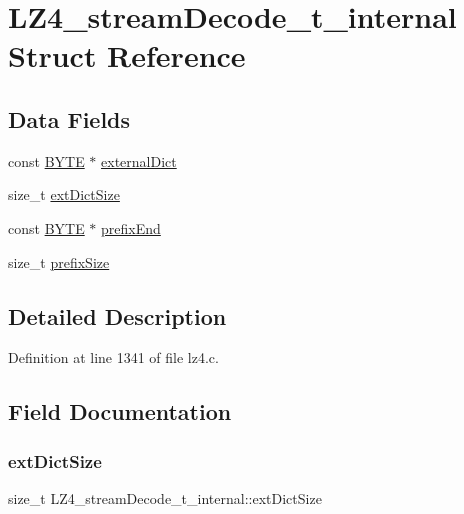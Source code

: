 \hypertarget{structLZ4__streamDecode__t__internal}{}\section{L\+Z4\+\_\+stream\+Decode\+\_\+t\+\_\+internal Struct Reference}
\label{structLZ4__streamDecode__t__internal}
\subsection*{Data Fields}
\begin{DoxyCompactItemize}
\item 
const \mbox{\hyperlink{lz4_8c_a4ae1dab0fb4b072a66584546209e7d58}{B\+Y\+TE}} $\ast$ \mbox{\hyperlink{structLZ4__streamDecode__t__internal_a0edc5a25f4e1e84e48c1a60900dabd4f}{external\+Dict}}
\item 
size\+\_\+t \mbox{\hyperlink{structLZ4__streamDecode__t__internal_a6c8e2dcc2579727808da0bfe7a44eaa0}{ext\+Dict\+Size}}
\item 
const \mbox{\hyperlink{lz4_8c_a4ae1dab0fb4b072a66584546209e7d58}{B\+Y\+TE}} $\ast$ \mbox{\hyperlink{structLZ4__streamDecode__t__internal_ae54ddf8eaf34cbc8919fb0dea3a5cb60}{prefix\+End}}
\item 
size\+\_\+t \mbox{\hyperlink{structLZ4__streamDecode__t__internal_a44f5f7acc14c2bb3865eccd5372107c4}{prefix\+Size}}
\end{DoxyCompactItemize}


\subsection{Detailed Description}


Definition at line 1341 of file lz4.\+c.



\subsection{Field Documentation}
\mbox{\label{structLZ4__streamDecode__t__internal_a6c8e2dcc2579727808da0bfe7a44eaa0}} 
\subsubsection{\texorpdfstring{ext\+Dict\+Size}{extDictSize}}
{\footnotesize\ttfamily size\+\_\+t L\+Z4\+\_\+stream\+Decode\+\_\+t\+\_\+internal\+::ext\+Dict\+Size}



